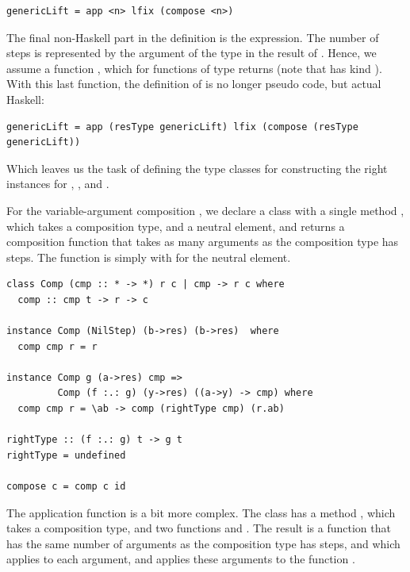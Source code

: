 \documentclass{llncs}
\begin{document}
\begin{small}
\begin{verbatim}
genericLift = app <n> lfix (compose <n>)
\end{verbatim}%
\end{small}

The final non-Haskell part in the definition is the  expression. The number of steps is represented by the argument of the  type in the result of . Hence, we assume a function , which for functions of type  returns  (note that  has kind \p{* -> *}). With this last function, the definition of  is no longer pseudo code, but actual Haskell:

\begin{small}
\begin{verbatim}
genericLift = app (resType genericLift) lfix (compose (resType genericLift))
\end{verbatim}%
\end{small}

Which leaves us the task of defining the type classes  for constructing the right instances for , , and .

For the variable-argument composition , we declare a class  with a single method , which takes a composition type, and a neutral element, and returns a composition function that takes as many arguments as the composition type has steps. The function  is simply  with  for the neutral element.

\begin{small}
\begin{verbatim}
class Comp (cmp :: * -> *) r c | cmp -> r c where
  comp :: cmp t -> r -> c

instance Comp (NilStep) (b->res) (b->res)  where
  comp cmp r = r  

instance Comp g (a->res) cmp =>
         Comp (f :.: g) (y->res) ((a->y) -> cmp) where
  comp cmp r = \ab -> comp (rightType cmp) (r.ab)

rightType :: (f :.: g) t -> g t
rightType = undefined

compose c = comp c id
\end{verbatim}
\end{small}

The application function is a bit more complex. The class  has a method , which takes a composition type, and two functions  and . The result is a function that has the same number of arguments as the composition type has steps, and which applies  to each argument, and applies these arguments to the function .
\end{document}

